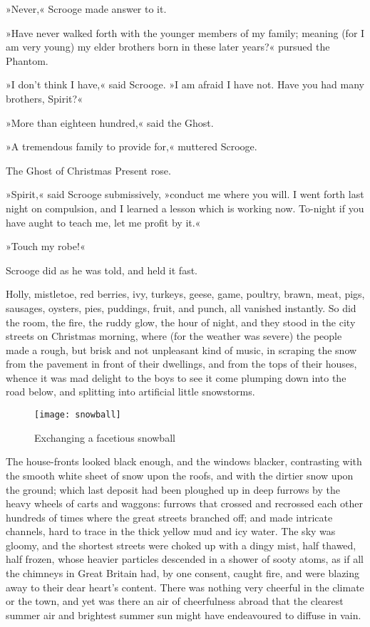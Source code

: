 »Never,« Scrooge made answer to it.

»Have never walked forth with the younger members of my family; meaning (for I am very young) my elder brothers born in these later years?« pursued the Phantom.

»I don't think I have,« said Scrooge. »I am afraid I have not. Have you had many brothers, Spirit?«

»More than eighteen hundred,« said the Ghost.

»A tremendous family to provide for,« muttered Scrooge.

The Ghost of Christmas Present rose.

»Spirit,« said Scrooge submissively, »conduct me where you will. I went forth last night on compulsion, and I learned a lesson which is working now. To-night if you have aught to teach me, let me profit by it.«

»Touch my robe!«

Scrooge did as he was told, and held it fast.

Holly, mistletoe, red berries, ivy, turkeys, geese, game, poultry, brawn, meat, pigs, sausages, oysters, pies, puddings, fruit, and  punch, all vanished instantly. So did the room, the fire, the ruddy glow, the hour of night, and they stood in the city streets on Christmas morning, where (for the weather was severe) the people made a rough, but brisk and not unpleasant kind of music, in scraping the snow from the pavement in front of their dwellings, and from the tops of their houses, whence it was mad delight to the boys to see it come plumping down into the road below, and splitting into artificial little snowstorms.

\begin{letter}
	\def\picsize{.8\textwidth}
\end{letter}
\begin{a4}
	\def\picsize{\textwidth}
\end{a4}


\begin{figure}[tb]
	\centering
	\texttt{[image: snowball]}
	\caption{Exchanging a facetious snowball}
\end{figure}

The house-fronts looked black enough, and the windows black\-er, contrasting with the smooth white sheet of snow upon the roofs, and with the dirtier snow upon the ground; which last deposit had been ploughed up in deep furrows by the heavy wheels of carts and waggons: furrows that crossed and recrossed each other hundreds of times where the great streets branched off; and made intricate channels, hard to trace in the thick yellow mud and icy water. The sky was gloomy, and the shortest streets were choked up with a dingy mist, half thawed, half frozen, whose heavier particles descended in a shower of sooty atoms, as if all the chimneys in Great Britain had, by one consent, caught fire, and were blazing away to their dear heart's content. There was nothing very cheerful in the climate or the town, and yet was there an air of cheerfulness abroad that the clearest summer air and brightest summer sun might have endeavoured to diffuse in vain.





